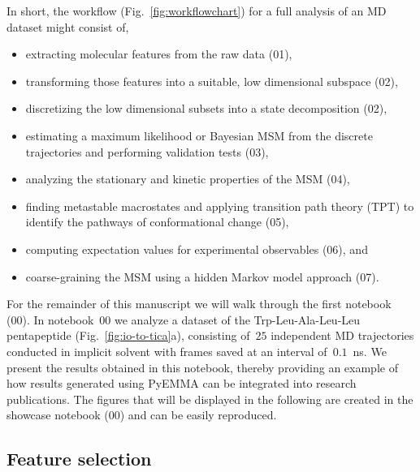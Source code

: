 \documentclass[9pt,tutorial]{livecoms}
\begin{document}
In short, the workflow (Fig.~\ref{fig:workflowchart}) for a full analysis of an MD dataset might consist of,
\begin{itemize}
	\item extracting molecular features from the raw data (01),
	\item transforming those features into a suitable, low dimensional subspace (02),
	\item discretizing the low dimensional subsets into a state decomposition (02),
	\item estimating a maximum likelihood or Bayesian MSM from the discrete trajectories and performing validation tests (03),
	\item analyzing the stationary and kinetic properties of the MSM (04),
	\item finding metastable macrostates and applying transition path theory (TPT) to identify the pathways of conformational change (05),
	\item computing expectation values for experimental observables (06), and
	\item coarse-graining the MSM using a hidden Markov model approach (07).
\end{itemize}

For the remainder of this manuscript we will walk through the first notebook (00).
In notebook~00 we analyze a dataset of the Trp-Leu-Ala-Leu-Leu pentapeptide (Fig.~\ref{fig:io-to-tica}a), consisting of~$25$ independent MD trajectories conducted in implicit solvent with frames saved at an interval of~$0.1$~ns.
We present the results obtained in this notebook, thereby providing an example of how results generated using PyEMMA can be integrated into research publications.
The figures that will be displayed in the following are created in the showcase notebook (00) and can be easily reproduced.

\subsection{Feature selection}
\end{document}
